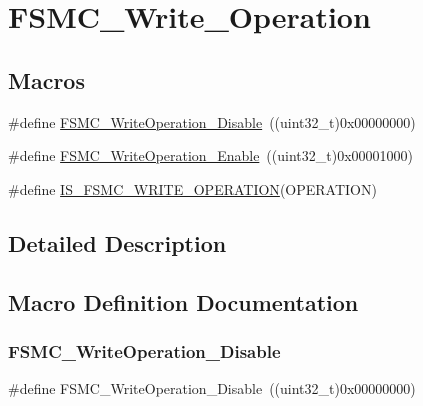 \hypertarget{group___f_s_m_c___write___operation}{}\section{F\+S\+M\+C\+\_\+\+Write\+\_\+\+Operation}
\label{group___f_s_m_c___write___operation}
\subsection*{Macros}
\begin{DoxyCompactItemize}
\item 
\#define \mbox{\hyperlink{group___f_s_m_c___write___operation_ga74176320484248f06abae854170f9d9f}{F\+S\+M\+C\+\_\+\+Write\+Operation\+\_\+\+Disable}}~((uint32\+\_\+t)0x00000000)
\item 
\#define \mbox{\hyperlink{group___f_s_m_c___write___operation_ga2478beb6dd8861b34a16b8a57a795e56}{F\+S\+M\+C\+\_\+\+Write\+Operation\+\_\+\+Enable}}~((uint32\+\_\+t)0x00001000)
\item 
\#define \mbox{\hyperlink{group___f_s_m_c___write___operation_ga87fc20d11761caa66c3e7d77a3a7d3e3}{I\+S\+\_\+\+F\+S\+M\+C\+\_\+\+W\+R\+I\+T\+E\+\_\+\+O\+P\+E\+R\+A\+T\+I\+ON}}(O\+P\+E\+R\+A\+T\+I\+ON)
\end{DoxyCompactItemize}


\subsection{Detailed Description}


\subsection{Macro Definition Documentation}
\mbox{\label{group___f_s_m_c___write___operation_ga74176320484248f06abae854170f9d9f}} 
\subsubsection{\texorpdfstring{FSMC\_WriteOperation\_Disable}{FSMC\_WriteOperation\_Disable}}
{\footnotesize\ttfamily \#define F\+S\+M\+C\+\_\+\+Write\+Operation\+\_\+\+Disable~((uint32\+\_\+t)0x00000000)}

